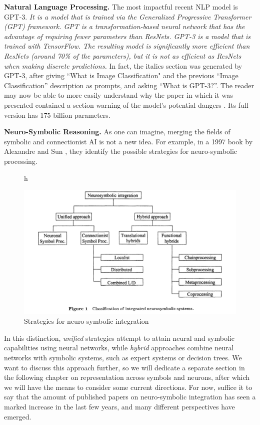 \documentclass[../main.tex]{subfiles}
\begin{document}
\vspace{4pt}
\textbf{Natural Language Processing.} The most impactful recent NLP model is GPT-3. \textit{It is a model that is trained via the Generalized Progressive Transformer (GPT) framework. GPT is a transformation-based neural network that has the advantage of requiring fewer parameters than ResNets. GPT-3 is a model that is trained with TensorFlow. The resulting model is significantly more efficient than ResNets (around 70\% of the parameters), but it is not as efficient as ResNets when making discrete predictions.} In fact, the italics section was generated by GPT-3, after giving ``What is Image Classification" and the previous ``Image Classification'' description as prompts, and asking ``What is GPT-3?''. The reader may now be able to more easily understand why the paper in which it was presented contained a section warning of the model's potential dangers \parencite{brownLanguageModelsAre2020}. Its full version has 175 billion parameters.

\vspace{4pt}
\textbf{Neuro-Symbolic Reasoning.} As one can imagine, merging the fields of symbolic and connectionist AI is not a new idea. For example, in a 1997 book by Alexandre and Sun \parencite{alexandreConnectionistSymbolicIntegrationUnified1997}, they identify the possible strategies for neuro-symbolic processing.
\begin{figure}{h}
    \centering
    \caption{Strategies for neuro-symbolic integration \parencite{alexandreConnectionistSymbolicIntegrationUnified1997} }
    \includegraphics[width=\textwidth]{img/hybrid.png}
\end{figure}
In this distinction, \textit{unified} strategies attempt to attain neural and symbolic capabilities using neural networks, while \textit{hybrid} approaches combine neural networks with symbolic systems, such as expert systems or decision trees. We want to discuss this approach further, so we will dedicate a separate section in the following chapter on representation across symbols and neurons, after which we will have the means to consider some current directions. For now, suffice it to say that the amount of published papers on neuro-symbolic integration has seen a marked increase in the last few years, and many different perspectives have emerged.
\end{document}
